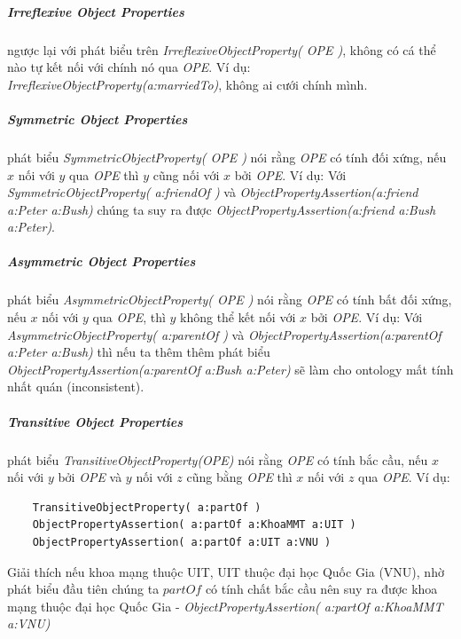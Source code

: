 	\subparagraph{Irreflexive Object Properties} ngược lại với phát biểu trên  \textit{IrreflexiveObjectProperty( OPE )}, không có cá thể nào tự kết nối với chính nó qua \textit{OPE}. Ví dụ: \textit{IrreflexiveObjectProperty(a:marriedTo)}, không ai cưới chính mình.
	
	\subparagraph{Symmetric Object Properties} phát biểu \textit{SymmetricObjectProperty( OPE )} nói rằng \textit{OPE} có tính đối xứng, nếu $x$ nối với $y$ qua \textit{OPE} thì $y$ cũng nối với $x$ bởi \textit{OPE}. Ví dụ: Với\textit{ SymmetricObjectProperty( a:friendOf )} và \textit{ObjectPropertyAssertion(a:friend a:Peter a:Bush)} chúng ta suy ra được \textit{ObjectPropertyAssertion(a:friend a:Bush a:Peter)}.
	
	\subparagraph{Asymmetric Object Properties} phát biểu \textit{AsymmetricObjectProperty( OPE )} nói rằng \textit{OPE} có tính bất đối xứng, nếu $x$ nối với $y$ qua \textit{OPE}, thì $y$ không thể kết nối với $x$ bởi \textit{OPE}. Ví dụ: Với \textit{AsymmetricObjectProperty( a:parentOf )}  và \textit{ObjectPropertyAssertion(a:parentOf a:Peter a:Bush)} thì nếu ta thêm thêm phát biểu \textit{ObjectPropertyAssertion(a:parentOf a:Bush a:Peter)} sẽ làm cho ontology mất tính nhất quán (inconsistent).
	
	\subparagraph{Transitive Object Properties} phát biểu \textit{TransitiveObjectProperty(OPE)} nói rằng \textit{OPE} có tính bắc cầu, nếu $x$ nối với $y$ bởi \textit{OPE} và $y$ nối với $z$ cũng bằng \textit{OPE} thì $x$ nối với $z$ qua \textit{OPE}. Ví dụ:
	\begin{verbatim}
	TransitiveObjectProperty( a:partOf ) 
	ObjectPropertyAssertion( a:partOf a:KhoaMMT a:UIT )
	ObjectPropertyAssertion( a:partOf a:UIT a:VNU )
	\end{verbatim}
	Giải thích nếu khoa mạng thuộc UIT, UIT thuộc đại học Quốc Gia (VNU), nhờ phát biểu đầu tiên chúng ta $partOf$ có tính chất bắc cầu nên suy ra được khoa mạng thuộc đại học Quốc Gia - \textit{ObjectPropertyAssertion( a:partOf a:KhoaMMT a:VNU)}
	
